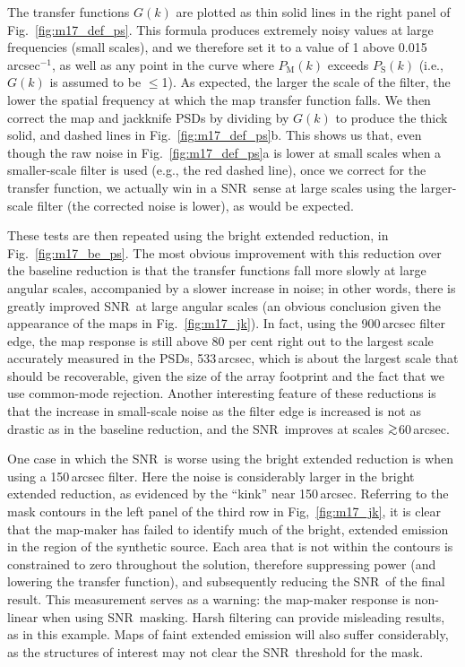 \documentclass[useAMS,usenatbib,nofootinbib]{mn2e}
\newcommand{\snr}{SNR}
\def\gsim{\mathrel{\lower2.5pt\vbox{\lineskip=0pt\baselineskip=0pt
          \hbox{$>$}\hbox{$\sim$}}}}
\begin{document}
The transfer functions $G(k)$ are plotted as thin solid lines in the
right panel of Fig.~\ref{fig:m17_def_ps}. This formula produces
extremely noisy values at large frequencies (small scales), and we
therefore set it to a value of 1 above 0.015\,arcsec$^{-1}$, as well
as any point in the curve where $P_\mathrm{M}(k)$ exceeds
$P_\mathrm{S}(k)$ (i.e., $G(k)$ is assumed to be $\le$1). As expected,
the larger the scale of the filter, the lower the spatial frequency at
which the map transfer function falls. We then correct the map and
jackknife PSDs by dividing by $G(k)$ to produce the thick solid, and
dashed lines in Fig.~\ref{fig:m17_def_ps}b. This shows us that, even
though the raw noise in Fig.~\ref{fig:m17_def_ps}a is lower at small
scales when a smaller-scale filter is used (e.g., the red dashed
line), once we correct for the transfer function, we actually win in a
\snr\ sense at large scales using the larger-scale filter (the
corrected noise is lower), as would be expected.

These tests are then repeated using the bright extended reduction, in
Fig.~\ref{fig:m17_be_ps}. The most obvious improvement with this
reduction over the baseline reduction is that the transfer functions
fall more slowly at large angular scales, accompanied by a slower
increase in noise; in other words, there is greatly improved \snr\ at
large angular scales (an obvious conclusion given the appearance of
the maps in Fig.~\ref{fig:m17_jk}). In fact, using the 900\,arcsec
filter edge, the map response is still above 80 per cent right out to
the largest scale accurately measured in the PSDs, 533\,arcsec, which
is about the largest scale that should be recoverable, given the size
of the array footprint and the fact that we use common-mode rejection.
Another interesting feature of these reductions is that the increase
in small-scale noise as the filter edge is increased is not as drastic
as in the baseline reduction, and the \snr\ improves at scales
$\gsim$60\,arcsec.

One case in which the \snr\ is worse using the bright extended
reduction is when using a 150\,arcsec filter. Here the noise is
considerably larger in the bright extended reduction, as evidenced by
the ``kink'' near 150\,arcsec. Referring to the mask contours in the
left panel of the third row in Fig,~\ref{fig:m17_jk}, it is clear
that the map-maker has failed to identify much of the bright, extended
emission in the region of the synthetic source. Each area that is not
within the contours is constrained to zero throughout the solution,
therefore suppressing power (and lowering the transfer function), and
subsequently reducing the \snr\ of the final result. This measurement
serves as a warning: the map-maker response is non-linear when using
\snr\ masking. Harsh filtering can provide misleading results, as in
this example. Maps of faint extended emission will also suffer
considerably, as the structures of interest may not clear the \snr\
threshold for the mask.
\end{document}
